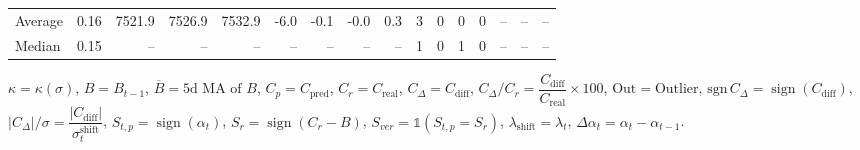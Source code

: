 \begin{threeparttable}
{\begin{tabular}{lrrrrrrrrrrrrrrr}
Average &     0.16 & 7521.9 & 7526.9 & 7532.9 &       -6.0 &           -0.1 &                     -0.0 &                 0.3 &              3 &         0 &     0 &         0 &         -- &        -- &             -- \\
 Median &     0.15 &     -- &     -- &     -- &         -- &             -- &                       -- &                  -- &              1 &         0 &     1 &         0 &         -- &        -- &             -- \\
\bottomrule
\end{tabular}
}
\begin{tablenotes}\footnotesize
\item $\kappa=\kappa(\sigma)$, $B=B_{t-1}$, $\overline{B}=\text{5d MA of }B$, $C_p=C_{\text{pred}}$, $C_r=C_{\text{real}}$, $C_\Delta=C_{\text{diff}}$, $C_\Delta/C_r=\dfrac{C_{\text{diff}}}{C_{\text{real}}}\times100$, $\mathrm{Out}=\text{Outlier}$, $\mathrm{sgn}\,C_\Delta=\operatorname{sign}(C_{\text{diff}})$, $|C_\Delta|/\sigma=\dfrac{|C_{\text{diff}}|}{\sigma_t^{\text{shift}}}$, $S_{t,p}=\operatorname{sign}(\alpha_t)$, $S_r=\operatorname{sign}(C_r - B)$, $S_{ver}=\mathbb{1}(S_{t,p}=S_r)$, $\lambda_{\text{shift}}=\lambda_t$, $\Delta\alpha_t=\alpha_t-\alpha_{t-1}$.\end{tablenotes}
\end{threeparttable}
\endgroup

